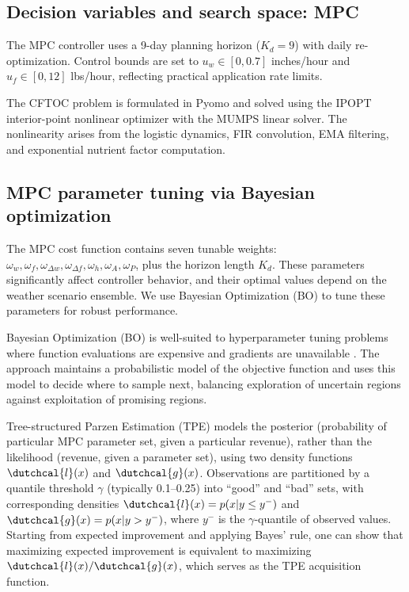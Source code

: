 \documentclass[preprint,12pt]{elsarticle}
\begin{document}
\subsection{Decision variables and search space: MPC}\label{subsec:design-vars-mpc}

The MPC controller uses a 9-day planning horizon ($K_{d} = 9$) with daily re-optimization. Control bounds are set to $u_w \in [0, 0.7]$ inches/hour and $u_f \in [0, 12]$ lbs/hour, reflecting practical application rate limits.

The CFTOC problem is formulated in Pyomo \cite{bynum2021pyomo} and solved using the IPOPT interior-point nonlinear optimizer \cite{wachter2006ipopt} with the MUMPS linear solver. The nonlinearity arises from the logistic dynamics, FIR convolution, EMA filtering, and exponential nutrient factor computation.

\subsection{MPC parameter tuning via Bayesian optimization}\label{subsec:mpc-params}

The MPC cost function contains seven tunable weights: $\omega_w, \omega_f, \omega_{\Delta w}, \omega_{\Delta f}, \omega_h, \omega_A, \omega_P$, plus the horizon length $K_{d}$. These parameters significantly affect controller behavior, and their optimal values depend on the weather scenario ensemble. We use Bayesian Optimization (BO) to tune these parameters for robust performance.

Bayesian Optimization (BO) is well-suited to hyperparameter tuning problems where function evaluations are expensive and gradients are unavailable \cite{shahriari2016taking}. The approach maintains a probabilistic model of the objective function and uses this model to decide where to sample next, balancing exploration of uncertain regions against exploitation of promising regions.

Tree-structured Parzen Estimation (TPE) \cite{bergstra2011algorithms} models the posterior (probability of particular MPC parameter set, given a particular revenue), rather than the likelihood (revenue, given a parameter set), using two density functions $\dutchcal{l}(x)$ and $\dutchcal{g}(x)$. Observations are partitioned by a quantile threshold $\gamma$ (typically 0.1--0.25) into ``good'' and ``bad'' sets, with corresponding densities $\dutchcal{l}(x) = p(x|y\leq y^{-})$ and $\dutchcal{g}(x) = p(x|y > y^{-})$, where $y^{-}$ is the $\gamma$-quantile of observed values. Starting from expected improvement and applying Bayes' rule, one can show that maximizing expected improvement is equivalent to maximizing $\dutchcal{l}(x)/\dutchcal{g}(x)$, which serves as the TPE acquisition function.
\end{document}
